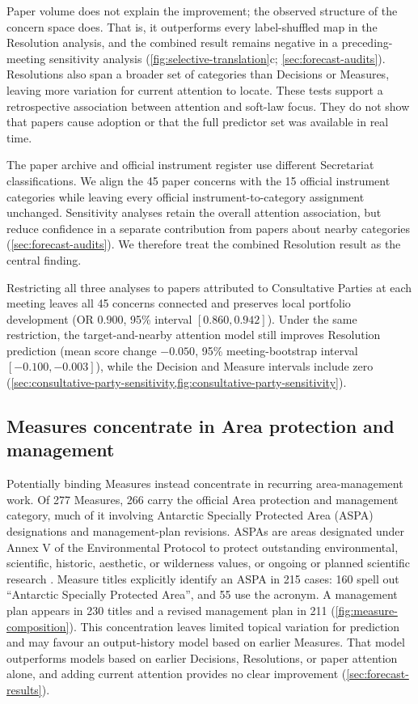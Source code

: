 \documentclass{fun_article}
\begin{document}
Paper volume does not explain the improvement; the observed structure of the concern space does. That is, it outperforms every label-shuffled map in the Resolution analysis, and the combined result remains negative in a preceding-meeting sensitivity analysis (\cref{fig:selective-translation}c; \cref{sec:forecast-audits}). Resolutions also span a broader set of categories than Decisions or Measures, leaving more variation for current attention to locate. These tests support a retrospective association between attention and soft-law focus. They do not show that papers cause adoption or that the full predictor set was available in real time.

The paper archive and official instrument register use different Secretariat classifications. We align the 45 paper concerns with the 15 official instrument categories while leaving every official instrument-to-category assignment unchanged. Sensitivity analyses retain the overall attention association, but reduce confidence in a separate contribution from papers about nearby categories (\cref{sec:forecast-audits}). We therefore treat the combined Resolution result as the central finding.

Restricting all three analyses to papers attributed to Consultative Parties at each meeting leaves all 45 concerns connected and preserves local portfolio development (OR $0.900$, 95\% interval $[0.860,0.942]$). Under the same restriction, the target-and-nearby attention model still improves Resolution prediction (mean score change $-0.050$, 95\% meeting-bootstrap interval $[-0.100,-0.003]$), while the Decision and Measure intervals include zero (\cref{sec:consultative-party-sensitivity,fig:consultative-party-sensitivity}).

\subsection{Measures concentrate in Area protection and management}
Potentially binding Measures instead concentrate in recurring area-management work. Of 277 Measures, 266 carry the official Area protection and management category, much of it involving Antarctic Specially Protected Area (ASPA) designations and management-plan revisions. ASPAs are areas designated under Annex V of the Environmental Protocol to protect outstanding environmental, scientific, historic, aesthetic, or wilderness values, or ongoing or planned scientific research \cite{ATSProtectedAreas}. Measure titles explicitly identify an ASPA in 215 cases: 160 spell out ``Antarctic Specially Protected Area'', and 55 use the acronym. A management plan appears in 230 titles and a revised management plan in 211 (\cref{fig:measure-composition}). This concentration leaves limited topical variation for prediction and may favour an output-history model based on earlier Measures. That model outperforms models based on earlier Decisions, Resolutions, or paper attention alone, and adding current attention provides no clear improvement (\cref{sec:forecast-results}).
\end{document}

